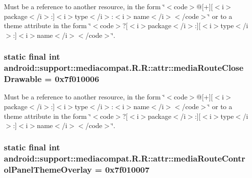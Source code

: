 Must be a reference to another resource, in the form \char`\"{}$<$code$>$@\mbox{[}+\mbox{]}\mbox{[}$<$i$>$package$<$/i$>$:\mbox{]}$<$i$>$type$<$/i$>$:$<$i$>$name$<$/i$>$$<$/code$>$\char`\"{} or to a theme attribute in the form \char`\"{}$<$code$>$?\mbox{[}$<$i$>$package$<$/i$>$:\mbox{]}\mbox{[}$<$i$>$type$<$/i$>$:\mbox{]}$<$i$>$name$<$/i$>$$<$/code$>$\char`\"{}. \hypertarget{classandroid_1_1support_1_1mediacompat_1_1_r_1_1attr_4aea01262b12d3208a98f9cb95070465}{
\subsubsection[{mediaRouteCloseDrawable}]{\setlength{\rightskip}{0pt plus 5cm}static final int android::support::mediacompat.R.R::attr::mediaRouteCloseDrawable = 0x7f010006}}
\label{classandroid_1_1support_1_1mediacompat_1_1_r_1_1attr_4aea01262b12d3208a98f9cb95070465}


Must be a reference to another resource, in the form \char`\"{}$<$code$>$@\mbox{[}+\mbox{]}\mbox{[}$<$i$>$package$<$/i$>$:\mbox{]}$<$i$>$type$<$/i$>$:$<$i$>$name$<$/i$>$$<$/code$>$\char`\"{} or to a theme attribute in the form \char`\"{}$<$code$>$?\mbox{[}$<$i$>$package$<$/i$>$:\mbox{]}\mbox{[}$<$i$>$type$<$/i$>$:\mbox{]}$<$i$>$name$<$/i$>$$<$/code$>$\char`\"{}. \hypertarget{classandroid_1_1support_1_1mediacompat_1_1_r_1_1attr_954d582a13e6f7d8e0213d1d58586a02}{
\subsubsection[{mediaRouteControlPanelThemeOverlay}]{\setlength{\rightskip}{0pt plus 5cm}static final int android::support::mediacompat.R.R::attr::mediaRouteControlPanelThemeOverlay = 0x7f010007}}
\label{classandroid_1_1support_1_1mediacompat_1_1_r_1_1attr_954d582a13e6f7d8e0213d1d58586a02}


